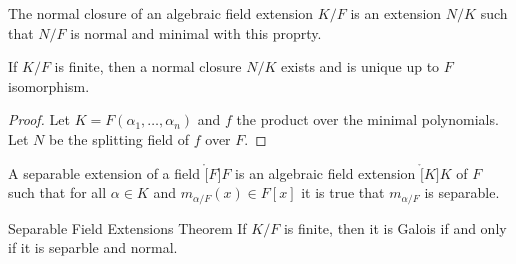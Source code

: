     \begin{definition}
        The normal closure of an algebraic field extension $K/F$ is an
        extension $N/K$ such that $N/F$ is normal and minimal with this
        proprty.
    \end{definition}
    \begin{theorem}
        If $K/F$ is finite, then a normal closure $N/K$ exists and is unique
        up to $F$ isomorphism.
    \end{theorem}
    \begin{proof}
        Let $K=F(\alpha_{1},\dots,\alpha_{n})$ and $f$ the product over the
        minimal polynomials. Let $N$ be the splitting field of $f$ over $F$.
    \end{proof}
    \begin{definition}
        A separable extension of a field $\ring[F]{F}$ is an algebraic field
        extension $\ring[K]{K}$ of $F$ such that for all $\alpha\in{K}$ and
        $m_{\alpha/F}(x)\in{F}[x]$ it is true that $m_{\alpha/F}$ is
        separable.
    \end{definition}
    \begin{ftheorem}{Separable Field Extensions Theorem}{}
        If $K/F$ is finite, then it is Galois if and only if it is separble
        and normal.
    \end{ftheorem}
